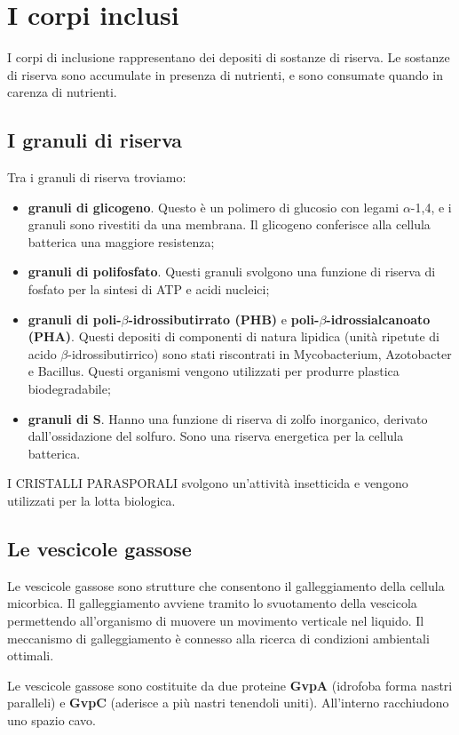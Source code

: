 \documentclass[11pt]{book}
\begin{document}
\section{I corpi inclusi}
I corpi di inclusione rappresentano dei depositi di sostanze di riserva. Le sostanze di riserva sono accumulate in presenza di nutrienti, e sono consumate quando in carenza di nutrienti.

\subsection{I granuli di riserva}
Tra i granuli di riserva troviamo:
\begin{itemize}
\item \textbf{granuli di glicogeno}. Questo è un polimero di glucosio con legami $\alpha$-1,4, e i granuli sono rivestiti da una membrana.
Il glicogeno conferisce alla cellula batterica una maggiore resistenza;
\item \textbf{granuli di polifosfato}. Questi granuli svolgono una funzione di riserva di fosfato per la sintesi di ATP e acidi nucleici;
\item \textbf{granuli di poli-$\beta$-idrossibutirrato (PHB)} e \textbf{poli-$\beta$-idrossialcanoato (PHA)}. Questi depositi di componenti di natura lipidica (unità ripetute di acido $\beta$-idrossibutirrico) sono stati riscontrati in Mycobacterium, Azotobacter e Bacillus. Questi organismi vengono utilizzati per produrre plastica biodegradabile;
\item \textbf{granuli di S}. Hanno una funzione di riserva di zolfo inorganico, derivato dall’ossidazione del solfuro. Sono una riserva energetica per la cellula batterica.
\end{itemize}

I CRISTALLI PARASPORALI svolgono un'attività insetticida e vengono utilizzati per la lotta biologica.

\subsection{Le vescicole gassose}

Le vescicole gassose sono strutture che consentono il galleggiamento della cellula micorbica. Il galleggiamento avviene tramito lo svuotamento della vescicola permettendo all'organismo di muovere un movimento verticale nel liquido. Il meccanismo di galleggiamento è connesso alla ricerca di condizioni ambientali ottimali.

\vspace{1em}
Le vescicole gassose sono costituite da due proteine \textbf{GvpA} (idrofoba forma nastri paralleli) e \textbf{GvpC} (aderisce a più nastri tenendoli uniti). All’interno racchiudono uno spazio cavo.\\
\end{document}
